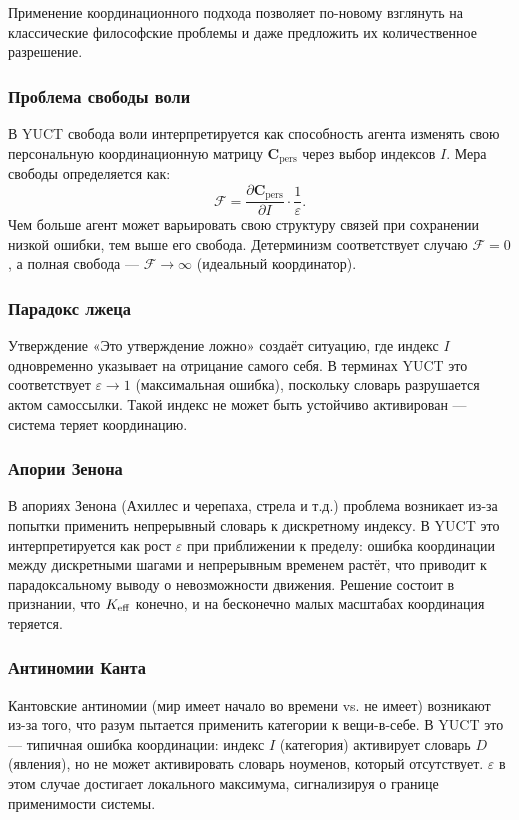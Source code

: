 \documentclass[12pt,a4paper]{article}
\newcommand{\eps}{\varepsilon}
\newcommand{\Cpers}{\mathbf{C}_{\text{pers}}}
\begin{document}
	Применение координационного подхода позволяет по-новому взглянуть на классические философские проблемы и даже предложить их количественное разрешение.
	
	\subsubsection{Проблема свободы воли}
	
	В YUCT свобода воли интерпретируется как способность агента изменять свою персональную координационную матрицу \(\Cpers\) через выбор индексов \(I\). Мера свободы определяется как:
	\[
	\mathcal{F} = \frac{\partial \Cpers}{\partial I} \cdot \frac{1}{\eps}.
	\]
	Чем больше агент может варьировать свою структуру связей при сохранении низкой ошибки, тем выше его свобода. Детерминизм соответствует случаю \(\mathcal{F} = 0\), а полная свобода — \(\mathcal{F} \to \infty\) (идеальный координатор).
	
	\subsubsection{Парадокс лжеца}
	
	Утверждение «Это утверждение ложно» создаёт ситуацию, где индекс \(I\) одновременно указывает на отрицание самого себя. В терминах YUCT это соответствует \(\eps \to 1\) (максимальная ошибка), поскольку словарь разрушается актом самоссылки. Такой индекс не может быть устойчиво активирован — система теряет координацию.
	
	\subsubsection{Апории Зенона}
	
	В апориях Зенона (Ахиллес и черепаха, стрела и т.д.) проблема возникает из-за попытки применить непрерывный словарь к дискретному индексу. В YUCT это интерпретируется как рост \(\eps\) при приближении к пределу: ошибка координации между дискретными шагами и непрерывным временем растёт, что приводит к парадоксальному выводу о невозможности движения. Решение состоит в признании, что \(\Keff\) конечно, и на бесконечно малых масштабах координация теряется.
	
	\subsubsection{Антиномии Канта}
	
	Кантовские антиномии (мир имеет начало во времени vs. не имеет) возникают из-за того, что разум пытается применить категории к вещи-в-себе. В YUCT это — типичная ошибка координации: индекс \(I\) (категория) активирует словарь \(D\) (явления), но не может активировать словарь ноуменов, который отсутствует. \(\eps\) в этом случае достигает локального максимума, сигнализируя о границе применимости системы.
	
\end{document}
